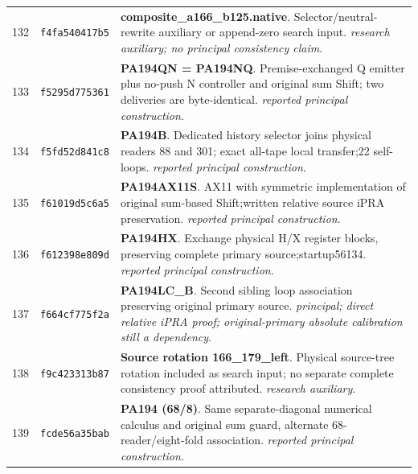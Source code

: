 \begin{longtable}{@{}r p{} p{}@{}}
132 & \texttt{f4fa540417b5} & \textbf{composite\_a166\_b125.native}. Selector/neutral-rewrite auxiliary or append-zero search input. \emph{research auxiliary; no principal consistency claim}.\\[3pt]
133 & \texttt{f5295d775361} & \textbf{PA194QN = PA194NQ}. Premise-exchanged Q emitter plus no-push N controller and original sum Shift; two deliveries are byte-identical. \emph{reported principal construction}.\\[3pt]
134 & \texttt{f5fd52d841c8} & \textbf{PA194B}. Dedicated history selector joins physical readers 88 and 301; exact all-tape local transfer;22 self-loops. \emph{reported principal construction}.\\[3pt]
135 & \texttt{f61019d5c6a5} & \textbf{PA194AX11S}. AX11 with symmetric implementation of original sum-based Shift;written relative source iPRA preservation. \emph{reported principal construction}.\\[3pt]
136 & \texttt{f612398e809d} & \textbf{PA194HX}. Exchange physical H/X register blocks, preserving complete primary source;startup56134. \emph{reported principal construction}.\\[3pt]
137 & \texttt{f664cf775f2a} & \textbf{PA194LC\_B}. Second sibling loop association preserving original primary source. \emph{principal; direct relative iPRA proof; original-primary absolute calibration still a dependency}.\\[3pt]
138 & \texttt{f9c423313b87} & \textbf{Source rotation 166\_179\_left}. Physical source-tree rotation included as search input; no separate complete consistency proof attributed. \emph{research auxiliary}.\\[3pt]
139 & \texttt{fcde56a35bab} & \textbf{PA194 (68/8)}. Same separate-diagonal numerical calculus and original sum guard, alternate 68-reader/eight-fold association. \emph{reported principal construction}.\\[3pt]
\end{longtable}
\normalsize
